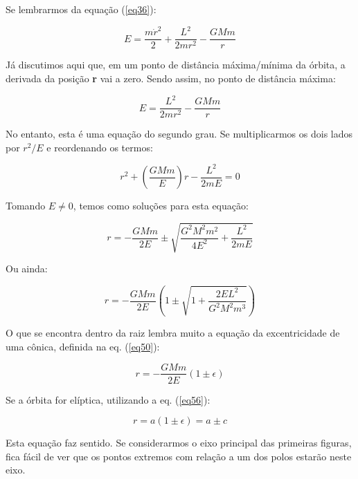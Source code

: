 Se lembrarmos da equação (\ref{eq36}):

\[
	E = \frac{m \dot{r}^2}{2} + \frac{L^2}{2mr^2} - \frac{GMm}{r}
\]

Já discutimos aqui que, em um ponto de distância máxima/mínima da órbita, a derivada da posição \textbf{r} vai a zero. Sendo assim, no ponto de distância máxima:

\[
	E = \frac{L^2}{2mr^2} - \frac{GMm}{r}
\]

No entanto, esta é uma equação do segundo grau. Se multiplicarmos os dois lados por $r^2 / E$ e reordenando os termos: 

\begin{equation}
	r^2 + \left(\frac{GMm}{E}\right)r - \frac{L^2}{2mE} = 0 	\label{eq66}
\end{equation}

Tomando $E \neq 0$, temos como soluções para esta equação:

\[
	r = - \frac{GMm}{2E} \pm \sqrt{\frac{G^2 M^2 m^2}{4E^2} + \frac{L^2}{2mE}}
\]

Ou ainda:

\[
	r = - \frac{GMm}{2E} \left(1 \pm \sqrt{1 + \frac{2EL^2}{G^2 M^2 m^3}} \right)
\]

O que se encontra dentro da raiz lembra muito a equação da excentricidade de uma cônica, definida na eq. (\ref{eq50}):

\begin{equation}
	r = - \frac{GMm}{2E}(1 \pm \epsilon)	\label{eq67}
\end{equation}

Se a órbita for elíptica, utilizando a eq. (\ref{eq56}):

\begin{equation}
	r = a(1 \pm \epsilon) = a \pm c	\label{eq68}
\end{equation}

Esta equação faz sentido. Se considerarmos o eixo principal das primeiras figuras, fica fácil de ver que os pontos extremos com relação a um dos polos estarão neste eixo.

